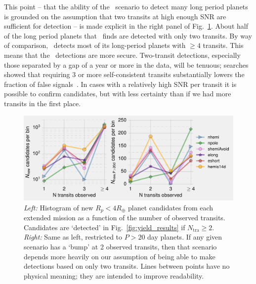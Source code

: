 \begin{enumerate}
	This point -- that the ability of the \hemis\ scenario to detect many long period planets is grounded on the assumption that two transits at high enough SNR are sufficient for detection -- is made explicit in the right panel of Fig.~\ref{fig:Ntra_hist}.
	About half of the long period planets that \hemis\ finds are detected with only two transits.
	By way of comparison, \npole\ detects most of its long-period planets with $\ge 4$ transits.
	This means that the \npole\ detections are more secure.
	Two-transit detections, especially those separated by a gap of a year or more in the \tess data, will be tenuous; \kepler searches showed that requiring 3 or more self-consistent transits substantially lowers the fraction of false signals~\citep{burke_Q1Q8_2014}.
	In cases with a relatively high SNR per transit it is possible to confirm candidates, but with less certainty than if we had more transits in the first place.
	\begin{figure}[!t]
		\centering
		\includegraphics[scale=1.]{figures/Ntra_histogram.pdf}
		\caption{ \textit{Left:} Histogram of new $R_p<4R_\oplus$ planet candidates from each extended mission as a function of the number of observed transits.
		Candidates are `detected' in Fig.~\protect\ref{fig:yield_results} if $N_\mathrm{tra}\geq2$.
		\textit{Right:} Same as left, restricted to $P>20$ day planets.
		If any given scenario has a `bump' at 2 observed transits, then that scenario depends more heavily on our assumption of being able to make detections based on only two transits.
		Lines between points have no physical meaning; they are intended to improve readability.}
		\label{fig:Ntra_hist}

\end{figure}
\end{enumerate}

